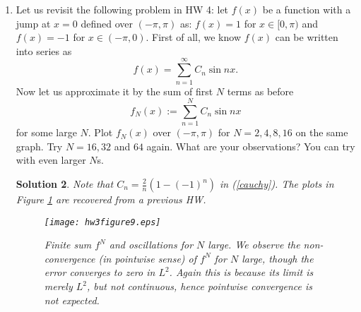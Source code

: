 \documentclass[6pt]{article}
\newtheorem{solution}{Solution}
\numberwithin{equation}{section}
\def\mathbb{\Bbb}
\begin{document}
\begin{enumerate}
\begin{solution}
\begin{equation}\label{hotpotfloat}
\left\{
\begin{array}{ll}
u_t=D\Delta u,& \textbf{x}\in B_0(R),t\in\mathbb R^+,\\
u(\textbf{x},0)=25 \text{\textdegree{C}},&\textbf{x}\in B_0(R),\\
u(\textbf{x},t)=\left\{
\begin{array}{ll}
25 \text{\textdegree{C}},& \theta\in (0,\pi),\\
100 \text{\textdegree{C}},& \theta\in (-\pi,0),
\end{array}
\right.
\end{array}
\right.
\end{equation}
where we applied the polar coordinates with $u(\textbf{x},t)=u(r,\phi,\theta,t)$, $r\in(0,R)$, $\phi\in(0,2\pi)$, $\theta\in(-\pi,\pi)$.  If the ball is not half dipped into the water, then a generalization of the surface separation is needed to characterize the BC and I leave it to motivated students.  Indeed, we also do not consider the surface oil (layer) which might have different influence on the cooking from the boiling water.
\end{solution}





\item Let us revisit the following problem in HW 4: let $f(x)$ be a function with a jump at $x=0$ defined over $(-\pi,\pi)$ as: $f(x)=1$ for $x\in[0,\pi)$ and $f(x)=-1$ for $x\in(-\pi,0)$.  First of all, we know $f(x)$ can be written into series as
       \begin{equation}\label{limit}
f(x)=\sum_{n=1}^\infty C_n\sin nx.
 \end{equation}
   Now let us approximate it by the sum of first $N$ terms as before
   \begin{equation}\label{cauchy}
 f_N(x):=\sum_{n=1}^N C_n\sin nx
 \end{equation}
    for some large $N$.  Plot $f_N(x)$ over $(-\pi,\pi)$ for $N=2,4,8,16$ on the same graph.  Try $N=16,32$ and $64$ again.  What are your observations?  You can try with even larger $N$s.
    \begin{solution}
Note that $C_n=\frac{2}{n}(1-(-1)^n)$ in (\ref{cauchy}).  The plots in Figure \ref{figure55a} are recovered from a previous HW.
     \begin{figure}[h!]\vspace{-8mm}
  \centering
\texttt{[image: hw3figure9.eps]}
\caption{Finite sum $f^N$ and oscillations for $N$ large.  We observe the non-convergence (in pointwise sense) of $f^N$ for $N$ large, though the error converges to zero in $L^2$.  Again this is because its limit is merely $L^2$, but not continuous, hence pointwise convergence is not expected.}\label{figure55a}
\end{figure}
    \end{solution}



\end{enumerate}
\end{document}
